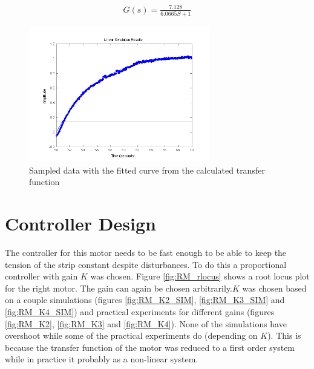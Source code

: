 \begin{align}
	G(s) = \frac{7.128}{6.0665S+1}
    \label{eq:RM_TF}
\end{align}

\begin{figure}[htbp]
\centering
\includegraphics[width = 0.7\textwidth]{pics/RM_systemID.png}
\caption{Sampled data with the fitted curve from the calculated transfer function}
\label{fig:RM_id}
\end{figure}

\FloatBarrier
\section{Controller Design}
The controller for this motor needs to be fast enough to be able to keep the tension of the strip constant despite disturbances. To do this a proportional controller with gain $K$ was chosen. Figure \ref{fig:RM_rlocus} shows a root locus plot for the right motor. The gain can again be chosen arbitrarily.$K$ was chosen based on a couple simulations (figures \ref{fig:RM_K2_SIM}, \ref{fig:RM_K3_SIM} and \ref{fig:RM_K4_SIM}) and  practical experiments for different gains (figures \ref{fig:RM_K2}, \ref{fig:RM_K3} and \ref{fig:RM_K4}). None of the simulations have overshoot while some of the practical experiments do (depending on $K$). This is because the transfer function of the motor was reduced to a first order system while in practice it probably as a non-linear system.

